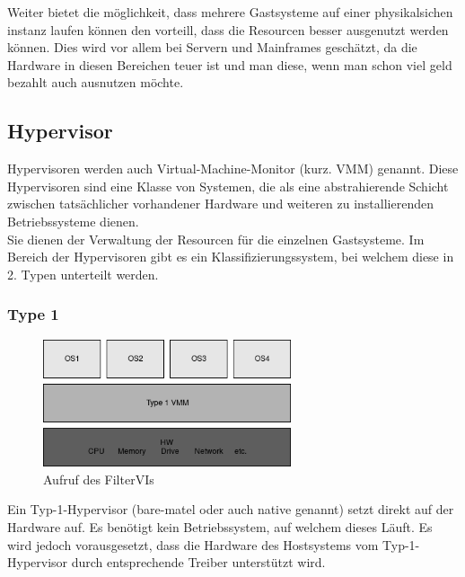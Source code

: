 \documentclass[14pt]{extreport}
\begin{document}
Weiter bietet die möglichkeit, dass mehrere Gastsysteme auf einer physikalsichen instanz laufen können den vorteill, dass die Resourcen besser ausgenutzt werden können. Dies wird vor allem bei Servern und Mainframes geschätzt, da die Hardware in diesen Bereichen teuer ist und man diese, wenn man schon viel geld bezahlt auch ausnutzen möchte.
\subsection{Hypervisor}
Hypervisoren werden auch Virtual-Machine-Monitor (kurz. VMM) genannt. Diese Hypervisoren sind eine Klasse von Systemen, die als eine abstrahierende Schicht zwischen tatsächlicher vorhandener Hardware und weiteren zu installierenden Betriebssysteme dienen.\\
Sie dienen der Verwaltung der Resourcen für die einzelnen Gastsysteme.
Im Bereich der Hypervisoren gibt es ein Klassifizierungssystem, bei welchem diese in 2. Typen unterteilt werden.
\subsubsection{Type 1}
\begin{figure}
	\begin{center}
		\includegraphics[width=0.65\textwidth]{png/VMMType1.png}
		\caption{Aufruf des FilterVIs}
		\label{fig:filterVI}
	\end{center}
\end{figure}
Ein Typ-1-Hypervisor (bare-matel oder auch native genannt) setzt direkt auf der Hardware auf. Es benötigt kein Betriebssystem, auf welchem dieses Läuft. Es wird jedoch vorausgesetzt, dass die Hardware des Hostsystems vom Typ-1-Hypervisor durch entsprechende Treiber unterstützt wird.\\

\newpage
\end{document}
